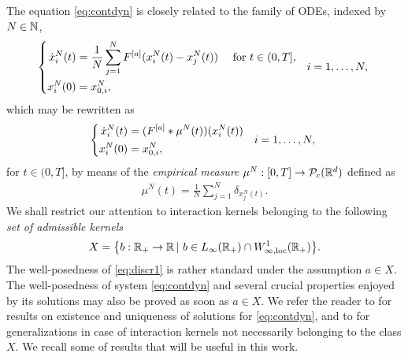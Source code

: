 The equation \eqref{eq:contdyn} is closely related to the family of ODEs, indexed by $N \in \mathbb{N}$,
\begin{align}\label{eq:discrdyn}
\left\{\begin{aligned}
\dot{x}^N_i(t) &= \frac{1}{N}\sum^N_{j = 1}F^{[a]}(x^N_i(t) - x^N_j(t)) \quad \text{ for } t \in (0,T],\\
x_i^N(0) &= x^N_{0,i},
\end{aligned} \quad i = 1, \ldots, N, \right.
\end{align}
which may be rewritten as 
\begin{align}\label{eq:discr1}
\left\{\begin{aligned}
\dot{x}^N_i(t) &= (F^{[a]}*\mu^N(t))(x^N_i(t)) \\
x^N_i(0) &= x^N_{0,i},
\end{aligned} \quad i = 1, \ldots, N, \right.
\end{align}
for $t\in(0,T]$, by means of the \textit{empirical measure} $\mu^N:[0,T]\rightarrow\mathcal{P}_c(\mathbb{R}^d)$ defined as
\begin{align}\label{eq:empmeas}
\mu^N(t) = \frac{1}{N}\sum^N_{j = 1} \delta_ {x^N_j(t)}.
\end{align}
We shall restrict our attention to interaction kernels belonging to the following \textit{set of admissible kernels}
\begin{align*}
	X=\bigl\{b:\mathbb{R}_+\rightarrow\mathbb{R}\,|\ b \in L_{\infty}(\mathbb{R}_+) \cap W^{1}_{\infty,\textup{loc}}(\mathbb{R}_+) \bigr \}.
\end{align*}
The well-posedness of \eqref{eq:discr1} is rather standard under the assumption $a \in X$. The well-posedness of system \eqref{eq:contdyn} and several crucial properties enjoyed by its solutions may also be proved as soon as $a \in X$.
We refer the reader to \cite{AGS} for results on existence and uniqueness of solutions for \eqref{eq:contdyn}, and to  \cite{13-Carrillo-Choi-Hauray-MFL} for generalizations in case of interaction kernels not necessarily belonging to the class $X$. We recall some of results that will be useful in this work.


